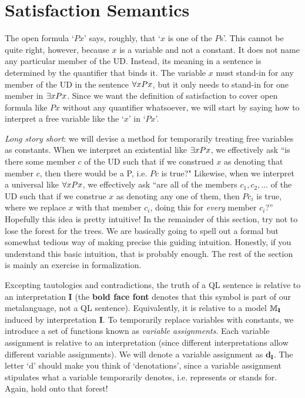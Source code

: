 \section{Satisfaction Semantics}
\label{sec:satisfactionQL}

The open formula `$Px$' says, roughly, that `$x$ is one of the $P$s'. This cannot be quite right, however, because $x$ is a variable and not a constant. It does not name any particular member of the UD. Instead, its meaning in a sentence is determined by the quantifier that binds it. The variable $x$ must stand-in for any member of the UD in the sentence $\forall xPx$, but it only needs to stand-in for one member in $\exists xPx$. Since we want the definition of satisfaction to cover open formula like $Px$ without any quantifier whatsoever, we will start by saying how to interpret a free variable like the `$x$' in `$Px$'. 

{\color{black}\textit{Long story short}: we will devise a method for temporarily treating free variables as constants. When we interpret an existential like $\exists x Px$, we effectively ask ``is there some member $c$ of the UD such that if we construed $x$ as denoting that member $c$, then there would be a P, i.e. $Pc$ is true?" Likewise, when we interpret a universal like $\forall x Px$, we effectively ask ``are all of the members $c_1, c_2, \dots$ of the UD such that if we construe $x$ as denoting any one of them, then $Pc_i$ is true, where we replace $x$ with that member $c_i$, doing this for \textit{every} member $c_i$?'' Hopefully this idea is pretty intuitive! In the remainder of this section, try not to lose the forest for the trees. We are basically going to spell out a formal but somewhat tedious way of making precise this guiding intuition. Honestly, if you understand this basic intuition, that is probably enough. The rest of the section is mainly an exercise in formalization.} 


{\color{black}Excepting tautologies and contradictions, the truth of a QL sentence is relative to an interpretation \textbf{I} (the \textbf{bold face font} denotes that this symbol is part of our metalanguage, not a QL sentence). Equivalently, it is relative to a model $\mathbb{M}_{\mathbf{I}}$ induced by interpretation \textbf{I}. To temporarily replace variables with constants, we introduce a set of functions known as \textit{variable assignments}. Each variable assignment is relative to an interpretation (since different interpretations allow different variable assignments). We will denote a variable assignment as $\mathbf{d_I}$. The letter `d' should make you think of `denotations', since a variable assignment stipulates what a variable temporarily denotes, i.e. represents or stands for. Again, hold onto that forest!} 

